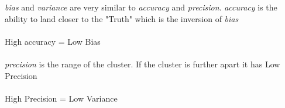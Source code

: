 \documentclass[12pt]{article}
\begin{document}
\begin{enumerate}

\emph{bias} and \emph{variance} are very similar to \emph{accuracy} and \emph{precision}. \emph{accuracy} is the ability to land closer to the "Truth" which is the inversion of \emph{bias} \\
\\
High accuracy = Low Bias \\
\\
\emph{precision} is the range of the cluster. If the cluster is further apart it has Low Precision \\
\\
High Precision = Low Variance

\end{enumerate}


\end{document}
